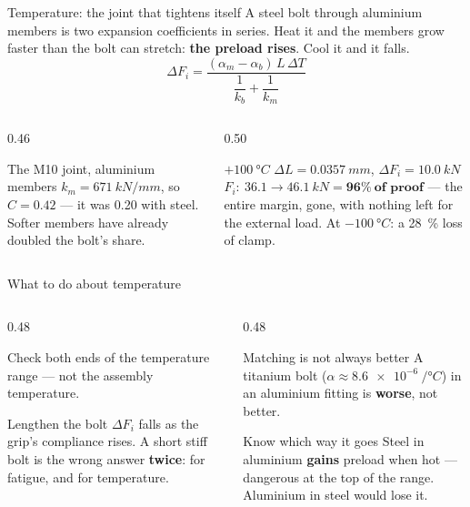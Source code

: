 \documentclass[aspectratio=169,10pt]{beamer}
\begin{document}
\begin{frame}{Temperature: the joint that tightens itself}
A steel bolt through aluminium members is two expansion coefficients in series. Heat it and the
members grow faster than the bolt can stretch: \textbf{the preload rises}. Cool it and it falls.
\[
\Delta F_i = \frac{(\alpha_m - \alpha_b)\,L\,\Delta T}{\dfrac{1}{k_b}+\dfrac{1}{k_m}}
\]
\vfill
\begin{columns}[T]
\begin{column}{0.46\textwidth}
\begin{block}{The M10 joint, aluminium members}
$k_m = \SI{671}{kN/mm}$, so $C = \mathbf{0.42}$ --- it was 0.20 with steel. Softer members have
already doubled the bolt's share.
\end{block}
\end{column}
\begin{column}{0.50\textwidth}
\begin{alertblock}{$+\SI{100}{\degree C}$}
$\Delta L = \SI{0.0357}{mm}$, $\Delta F_i = \SI{10.0}{kN}$
\vspace{2pt}
$F_i:\ 36.1 \to \SI{46.1}{kN} = \mathbf{96\%\ \text{of proof}}$ --- the entire margin, gone, with
nothing left for the external load. At $-\SI{100}{\degree C}$: a \SI{28}{\percent} loss of clamp.
\end{alertblock}
\end{column}
\end{columns}
\end{frame}

\begin{frame}{What to do about temperature}
\begin{columns}[T]
\begin{column}{0.48\textwidth}
\begin{block}{Check both ends}
of the temperature range --- not the assembly temperature.
\end{block}
\begin{block}{Lengthen the bolt}
$\Delta F_i$ falls as the grip's compliance rises. A short stiff bolt is the wrong answer
\textbf{twice}: for fatigue, and for temperature.
\end{block}
\end{column}
\begin{column}{0.48\textwidth}
\begin{alertblock}{Matching is not always better}
A titanium bolt ($\alpha\approx\SI{8.6e-6}{/\degree C}$) in an aluminium fitting is \textbf{worse},
not better.
\end{alertblock}
\begin{block}{Know which way it goes}
Steel in aluminium \textbf{gains} preload when hot --- dangerous at the top of the range. Aluminium
in steel would lose it.
\end{block}
\end{column}
\end{columns}
\end{frame}
\end{document}
